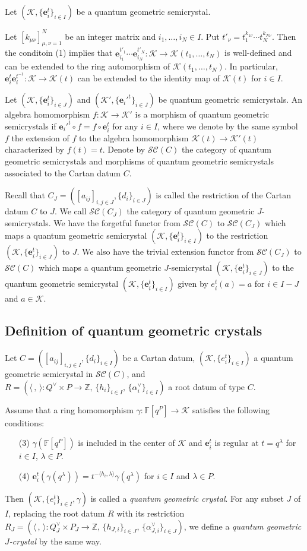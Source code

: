 \documentclass[12pt,a4paper]{article}
\newcommand\bra{\langle}
\newcommand\ket{\rangle}
\newcommand\av{\alpha^\vee}
\newcommand\ah{h}
\newcommand\Qv{Q^\vee}
\newcommand\K{{\mathcal K}}
\newcommand\e{{\mathbf e}}
\newcommand\QGSC{{\mathcal{SC}}}
\newcommand\Z{{\mathbb Z}} %
\newcommand\F{{\mathbb F}} %
\theoremstyle{plain} %
\theoremstyle{definition} %
\theoremstyle{definition} %
\numberwithin{theorem}{section}
\numberwithin{equation}{section}
\numberwithin{figure}{section}
\numberwithin{table}{section}
\begin{document}
Let $(\K,\{\e_i^t\}_{i\in I})$ be a quantum geometric semicrystal.

Let $[k_{\mu\nu}]_{\mu,\nu=1}^N$ be an integer matrix
and $i_1,\ldots,i_N\in I$.
Put $t'_\nu=t_1^{k_{1\nu}}\cdots t_N^{k_{N\nu}}$.
Then the conditoin (1) implies that 
$\e_{i_1}^{t'_1}\cdots\e_{i_N}^{t'_N}:\K\to\K(t_1,\ldots,t_N)$ is well-defined
and can be extended to the ring automorphism of $\K(t_1,\ldots,t_N)$.
In particular, $\e_i^t\e_i^{t^{-1}}:\K\to\K(t)$
can be extended to the identity map of $\K(t)$ for $i\in I$.

Let $(\K,\{\e_i^t\}_{i\in J})$ and $(\K',\{\e_i'^t\}_{i\in J})$ 
be quantum geometric semicrystals.
An algebra homomorphism $f:\K\to\K'$ is a morphism of quantum geometric 
semicrystals if $\e_i'^t\circ f=f\circ\e_i^t$ for any $i\in I$, 
where we denote by the same symbol $f$ the extension of $f$ 
to the algebra homomorphism $\K(t)\to\K'(t)$ characterized by $f(t)=t$.
Denote by $\QGSC(C)$ the category of quantum geometric semicrystals and 
morphisms of quantum geometric semicrystals associated 
to the Cartan datum $C$.

Recall that $C_J=([a_{ij}]_{i,j\in J}, \{d_i\}_{i\in J})$ 
is called the restriction of the Cartan datum $C$ to $J$.
We call $\QGSC(C_J)$ the category of quantum geometric $J$-semicrystals.
We have the forgetful functor from $\QGSC(C)$ to $\QGSC(C_J)$ 
which maps a quantum geometric semicrystal $(\K,\{\e_i^t\}_{i\in I})$ 
to the restriction $(\K,\{\e_i^t\}_{i\in J})$ to $J$.
We also have the trivial extension functor from $\QGSC(C_J)$ to $\QGSC(C)$ 
which maps a quantum geometric $J$-semicrystal $(\K,\{\e_i^t\}_{i\in J})$
to the quantum geometric semicrystal $(\K,\{\e_i^t\}_{i\in I})$ 
given by $e_i^t(a)=a$ for $i\in I-J$ and $a\in\K$.

\subsection{Definition of quantum geometric crystals}

Let $C=([a_{ij}]_{i,j\in I},\{d_i\}_{i\in I})$ be a Cartan datum,
$(\K,\{e_i^t\}_{i\in I})$ a quantum geometric semicrystal in $\QGSC(C)$, and
$R=(\bra\,,\,\ket:\Qv\times P\to\Z,\,\{\ah_i\}_{i\in I},\,\allowbreak\{\av_i\}_{i\in I})$ 
a root datum of type $C$.

Assume that a ring homomorphism
$\gamma:\F[q^P]\to\K$ satisfies the following conditions:
\begin{enumerate}
 \item[(3)] $\gamma(\F[q^P])$ is included in the center of $\K$
  and $\e_i^t$ is regular at $t=q^\lambda$ for $i\in I$, $\lambda\in P$.
 \item[(4)] $\e_i^t(\gamma(q^\lambda))=t^{-\bra h_i,\lambda\ket}\gamma(q^\lambda)$
  for $i\in I$ and $\lambda\in P$.
\end{enumerate}
Then $(\K,\{e_i^t\}_{i\in I},\gamma)$ is called a {\em quantum geometric crystal}.
For any subset $J$ of $I$, replacing the root datum $R$ 
with its restriction
$R_J=(\bra\,,\,\ket:\Qv_J\times P_J\to\Z,\,
\{\ah_{J,i}\}_{i\in J},\,
\{\av_{J,i}\}_{i\in J})$,
we define a {\em quantum geometric $J$-crystal} by the same way.
\end{document}
